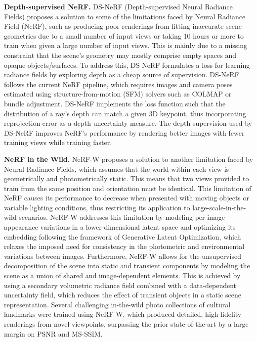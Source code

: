 \documentclass[conference]{IEEEtran}
\begin{document}
\textbf{Depth-supervised NeRF.} DS-NeRF (Depth-supervised Neural Radiance Fields) \cite{deng2022depthsupervised} proposes a solution to some of the limitations faced by Neural Radiance Field (NeRF), such as producing poor renderings from fitting inaccurate scene geometries due to a small number of input views or taking 10 hours or more to train when given a large number of input views. This is mainly due to a missing constraint that the scene's geometry may mostly comprise empty spaces and opaque objects/surfaces. To address this, DS-NeRF formulates a loss for learning radiance fields by exploring depth as a cheap source of supervision. DS-NeRF follows the current NeRF pipeline, which requires images and camera poses estimated using structure-from-motion (SFM) solvers such as COLMAP or bundle adjustment. DS-NeRF implements the loss function such that the distribution of a ray's depth can match a given 3D keypoint, thus incorporating reprojection error as a depth uncertainty measure. The depth supervision used by DS-NeRF improves NeRF's performance by rendering better images with fewer training views while training faster. \vspace{2mm}

\textbf{NeRF in the Wild.} NeRF-W \cite{nerf_w} proposes a solution to another limitation faced by Neural Radiance Fields, which assumes that the world within each view is geometrically and photometrically static. This means that two views provided to train from the same position and orientation must be identical. This limitation of NeRF causes its performance to decrease when presented with moving objects or variable lighting conditions, thus restricting its application to large-scale-in-the-wild scenarios. NeRF-W addresses this limitation by modeling per-image appearance variations in a lower-dimensional latent space and optimizing its embedding following the framework of Generative Latent Optimization, which relaxes the imposed need for consistency in the photometric and environmental variations between images. Furthermore, NeRF-W allows for the unsupervised decomposition of the scene into static and transient components by modeling the scene as a union of shared and image-dependent elements. This is achieved by using a secondary volumetric radiance field combined with a data-dependent uncertainty field, which reduces the effect of transient objects in a static scene representation. Several challenging in-the-wild photo collections of cultural landmarks were trained using NeRF-W, which produced detailed, high-fidelity renderings from novel viewpoints, surpassing the prior state-of-the-art by a large margin on PSNR and MS-SSIM. \vspace{2mm}
\end{document}
